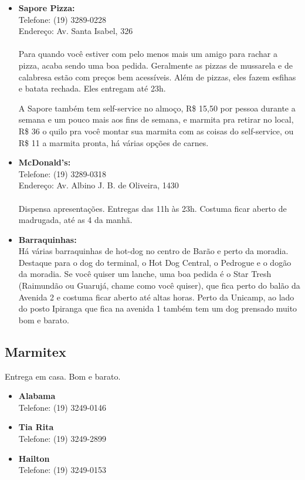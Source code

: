 \begin{itemize}
      \item \textbf{Sapore Pizza:}
        \\Telefone: (19) 3289-0228
        \\Endereço: Av. Santa Isabel, 326
        \\\\
        Para quando você estiver com pelo menos mais um amigo para rachar a
        pizza, acaba sendo uma boa pedida. Geralmente as pizzas de mussarela e
        de calabresa estão com preços bem acessíveis. Além de pizzas, eles fazem
        esfihas e batata rechada. Eles entregam até 23h.

        A Sapore também tem self-service no almoço, R\$ 15,50 por pessoa durante
        a semana e um pouco mais aos fins de semana, e marmita pra retirar no
        local, R\$ 36 o quilo pra você montar sua marmita com as coisas do
        self-service, ou R\$ 11 a marmita pronta, há várias opções de carnes.

    \item   \textbf{McDonald's:}
        \\Telefone: (19) 3289-0318
        \\Endereço: Av. Albino J. B. de Oliveira, 1430
        \\\\
        Dispensa apresentações. Entregas das 11h às 23h. Costuma ficar aberto de
        madrugada, até as 4 da manhã.

    \item   \textbf{Barraquinhas:}
        \\Há várias barraquinhas de hot-dog no centro de Barão e perto da
        moradia. Destaque para o dog do terminal, o Hot Dog Central, o Pedrogue
        e o dogão da moradia. Se você quiser um lanche, uma boa pedida é o Star
        Tresh (Raimundão ou Guarujá, chame como você quiser), que fica perto do
        balão da Avenida 2 e costuma ficar aberto até altas horas. Perto da
        Unicamp, ao lado do posto Ipiranga que fica na avenida 1 também tem um
        dog prensado muito bom e barato.
\end{itemize}

\subsection{Marmitex}

Entrega em casa. Bom e barato.

\begin{itemize}
    \item   \textbf{Alabama}
        \\Telefone: (19) 3249-0146

    \item   \textbf{Tia Rita}
        \\Telefone: (19) 3249-2899

    \item   \textbf{Hailton}
        \\Telefone: (19) 3249-0153
\end{itemize}

